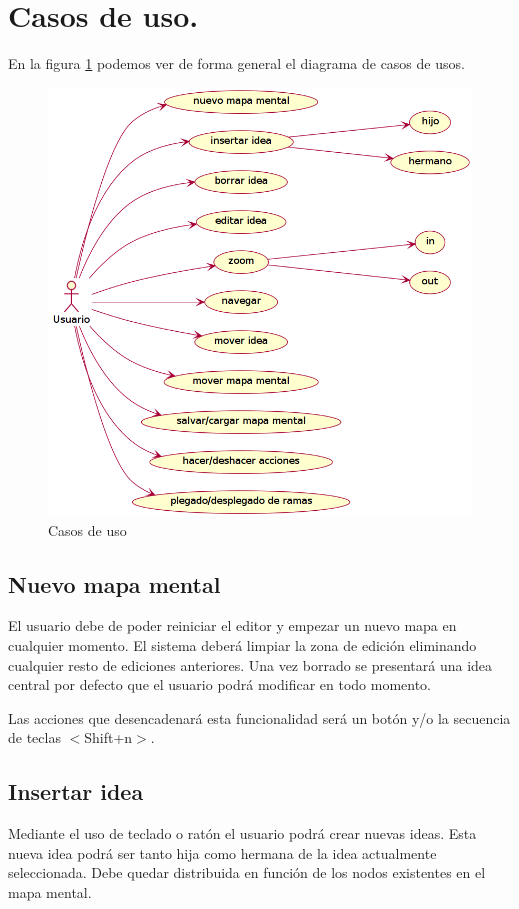\section{Casos de uso.}

En la figura \ref{fig:casosdeuso} podemos ver de forma general el diagrama de casos de usos.

\begin{figure}[htbp]
\centering
\includegraphics[width=\textwidth]{imagenes/casos-de-uso}
\caption{Casos de uso}
\label{fig:casosdeuso}
\end{figure}

\subsection{Nuevo mapa mental}
El usuario debe de poder reiniciar el editor y empezar un nuevo mapa en cualquier momento. El sistema deberá limpiar la zona de edición eliminando cualquier resto de ediciones anteriores. Una vez borrado se presentará una idea central por defecto que el usuario podrá modificar en todo momento. 

Las acciones que desencadenará esta funcionalidad será un botón y/o la secuencia de teclas $<$Shift+n$>$.

\subsection{Insertar idea}
Mediante el uso de teclado o ratón el usuario podrá crear nuevas ideas. Esta nueva idea podrá ser tanto hija como hermana de la idea actualmente seleccionada. Debe quedar distribuida en función de los nodos existentes en el mapa mental. 

